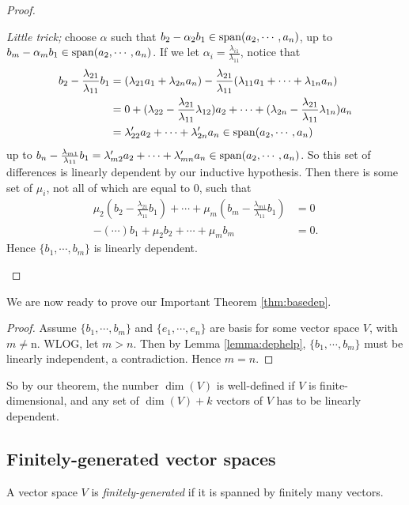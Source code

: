 \begin{proof}
\begin{enumerate}[{Case} 1)]
    \emph{Little trick;} choose $\alpha$ such that $b_2-\alpha_2 b_1 \in\operatorname{span}(a_2,\cdots,a_n)$, up to $b_m-\alpha_m b_1 \in\operatorname{span}(a_2,\cdots,a_n)$. If we let $\alpha_i = \frac{\lambda_{i1}}{\lambda_{11}}$, notice that
    \begin{align*}
      b_2-\frac{\lambda_{21}}{\lambda_{11}}b_1 &= (\lambda_{21} a_1 + \lambda_{2n} a_n) - \frac{\lambda_{21}}{\lambda_{11}}(\lambda_{11}a_1 + \cdots + \lambda_{1n} a_n)\\
        &= 0 + (\lambda_{22} - \frac{\lambda_{21}}{\lambda_{11}}\lambda_{12})a_2 + \cdots + (\lambda_{2n} - \frac{\lambda_{21}}{\lambda_{11}}\lambda_{1n}) a_n\\
        &= \lambda'_{22}a_2 + \cdots + \lambda'_{2n} a_n \in \operatorname{span}(a_2,\cdots,a_n)
    \end{align*}
    up to $b_n-\frac{\lambda_{m1}}{\lambda_{11}} b_1 = \lambda'_{m2}a_2 + \cdots + \lambda'_{mn}a_n\in\operatorname{span}(a_2,\cdots,a_n)$. So this set of differences is linearly dependent by our inductive hypothesis. Then there is some set of $\mu_i$, not all of which are equal to 0, such that
    \begin{align*}
      \mu_2(b_2 - \frac{\lambda_{21}}{\lambda_{11}}b_1) + \cdots + \mu_m (b_m - \frac{\lambda_{m1}}{\lambda_{11}}b_1) &= 0\\
      -(\cdots) b_1 + \mu_2 b_2 + \cdots + \mu_m b_m &= 0.
    \end{align*}
    Hence $\{b_1,\cdots,b_m\}$ is linearly dependent.
  \end{enumerate}
\end{proof}

We are now ready to prove our Important Theorem \ref{thm:basedep}.
\begin{proof}
  Assume $\{b_1,\cdots,b_m\}$ and $\{e_1,\cdots,e_n\}$ are basis for some vector space $V$, with $m\neq $n. WLOG, let $m>n$. Then by Lemma \ref{lemma:dephelp}, $\{b_1,\cdots,b_m\}$ must be linearly independent, a contradiction. Hence $m=n$.
\end{proof}


So by our theorem, the number $\dim(V)$ is well-defined if $V$ is finite-dimensional, and any set of $\dim(V)+k$ vectors of $V$ has to be linearly dependent.

\subsection{Finitely-generated vector spaces}

\begin{definition}
  A vector space $V$ is \emph{finitely-generated} if it is spanned by finitely many vectors.
\end{definition}

